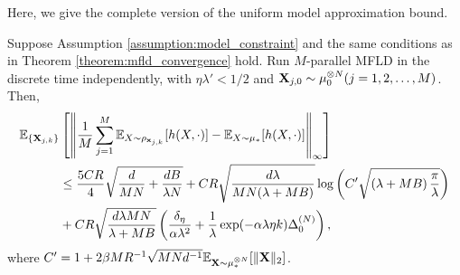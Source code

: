 Here, we give the complete version of the uniform model approximation bound.
\begin{theorem}\label{theorem:uniform_approximation_multiple_mfld_complete}
    Suppose Assumption \ref{assumption:model_constraint} and the same conditions as in Theorem \ref{theorem:mfld_convergence} hold. Run $M$-parallel MFLD in the discrete time independently, with $\eta \lambda' < 1/2$ and $\vX_{j,0} \sim \tensor[\mu,N]_0 (j=1,2,\ldots,M)$. Then,
    \begin{align*}
        \bE_{\{\vX_{j,k}\}}&\left[\left\| \frac{1}{M}\sum_{j=1}^M \bE_{X\sim \rho_{\vx_{j,k}}}[h(X,\cdot)] - \bE_{X\sim \mu_*} [h(X,\cdot)]\right\|_\infty\right] \\
        &\leq \frac{5CR}{4}\sqrt{\frac{d}{MN} + \frac{dB}{\lambda N}}
        + CR\sqrt{\frac{d\lambda}{MN(\lambda + MB)}}\log\left( C'\sqrt{\left(\lambda+MB\right)\frac{\pi}{\lambda}} \right) \\
        &+ CR\sqrt{\frac{d\lambda M N}{\lambda + MB}} \left(\frac{ \delta_{\eta}}{\alpha\lambda^2} 
        + \frac{1}{\lambda}\exp( -\alpha\lambda\eta k )\pow[\Delta,N]_0 \right),\\
    \end{align*}
    where $C'=1 + 2\beta MR^{-1}\sqrt{MNd^{-1}}\bE_{\vX\sim\tensor[\mu,N]_*}[\|\vX\|_2]$.
\end{theorem}

